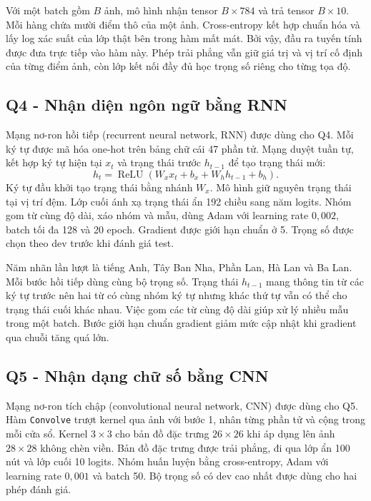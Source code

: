 \documentclass[conference]{IEEEtran}
\begin{document}
Với một batch gồm \(B\) ảnh, mô hình nhận tensor \(B\times784\) và trả tensor \(B\times10\). Mỗi hàng chứa mười điểm thô của một ảnh. Cross-entropy kết hợp chuẩn hóa và lấy log xác suất của lớp thật bên trong hàm mất mát. Bởi vậy, đầu ra tuyến tính được đưa trực tiếp vào hàm này. Phép trải phẳng vẫn giữ giá trị và vị trí cố định của từng điểm ảnh, còn lớp kết nối đầy đủ học trọng số riêng cho từng tọa độ.

\subsection{Q4 - Nhận diện ngôn ngữ bằng RNN}
Mạng nơ-ron hồi tiếp (recurrent neural network, RNN) được dùng cho Q4. Mỗi ký tự được mã hóa one-hot trên bảng chữ cái 47 phần tử. Mạng duyệt tuần tự, kết hợp ký tự hiện tại \(x_t\) và trạng thái trước \(h_{t-1}\) để tạo trạng thái mới:
\[
h_t=\operatorname{ReLU}(W_x x_t+b_x+W_h h_{t-1}+b_h).
\]
Ký tự đầu khởi tạo trạng thái bằng nhánh \(W_x\). Mô hình giữ nguyên trạng thái tại vị trí đệm. Lớp cuối ánh xạ trạng thái ẩn 192 chiều sang năm logits. Nhóm gom từ cùng độ dài, xáo nhóm và mẫu, dùng Adam với learning rate \(0{,}002\), batch tối đa 128 và 20 epoch. Gradient được giới hạn chuẩn ở 5. Trọng số được chọn theo dev trước khi đánh giá test.

Năm nhãn lần lượt là tiếng Anh, Tây Ban Nha, Phần Lan, Hà Lan và Ba Lan. Mỗi bước hồi tiếp dùng cùng bộ trọng số. Trạng thái \(h_{t-1}\) mang thông tin từ các ký tự trước nên hai từ có cùng nhóm ký tự nhưng khác thứ tự vẫn có thể cho trạng thái cuối khác nhau. Việc gom các từ cùng độ dài giúp xử lý nhiều mẫu trong một batch. Bước giới hạn chuẩn gradient giảm mức cập nhật khi gradient qua chuỗi tăng quá lớn.

\subsection{Q5 - Nhận dạng chữ số bằng CNN}
Mạng nơ-ron tích chập (convolutional neural network, CNN) được dùng cho Q5. Hàm \texttt{Convolve} trượt kernel qua ảnh với bước 1, nhân từng phần tử và cộng trong mỗi cửa sổ. Kernel \(3\times3\) cho bản đồ đặc trưng \(26\times26\) khi áp dụng lên ảnh \(28\times28\) không chèn viền. Bản đồ đặc trưng được trải phẳng, đi qua lớp ẩn 100 nút và lớp cuối 10 logits. Nhóm huấn luyện bằng cross-entropy, Adam với learning rate \(0{,}001\) và batch 50. Bộ trọng số có dev cao nhất được dùng cho hai phép đánh giá.
\end{document}
